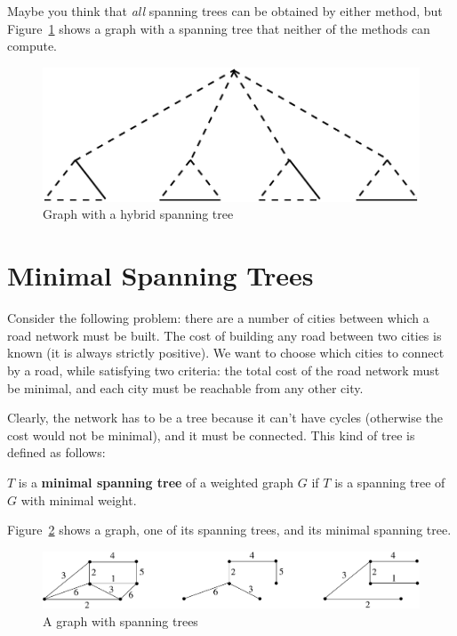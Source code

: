 Maybe you think that \emph{all} spanning trees can be obtained by
either method, but Figure~\ref{opspannend5} shows a graph with a
spanning tree that neither of the methods can compute.

\begin{figure}[ht]
	\centering
	\includegraphics[width=0.5\linewidth,keepaspectratio]{opspannend5}
	\caption{Graph with a hybrid spanning tree\label{opspannend5}}
\end{figure}

\section{Minimal Spanning Trees}

Consider the following problem: there are a number of cities between
which a road network must be built. The cost of building any road
between two cities is known (it is always strictly positive). We want
to choose which cities to connect by a road, while satisfying two
criteria: the total cost of the road network must be minimal, and each city must be
reachable from any other city.

Clearly, the network has to be a tree because it can't have cycles
(otherwise the cost would not be minimal), and it must be connected.
This kind of tree is defined as follows:

 \begin{definition}
\textup{$T$ is a \textbf{minimal spanning tree} of a weighted graph
$G$ if $T$ is a spanning tree of $G$ with minimal weight.}
\end{definition}

Figure~\ref{opspannend1} shows a graph, one of its spanning trees, and
its minimal spanning tree.

\begin{figure}[ht]
	\centering
	\includegraphics[width=0.6\linewidth,keepaspectratio]{opspannend1}
	\caption{A graph with spanning trees\label{opspannend1}}
\end{figure}

